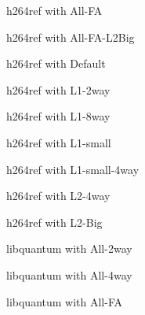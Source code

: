 \documentclass[cacheSimReport.tex]{subfiles}
\begin{document}

\pagebreak
\begin{center}
{\Large{h264ref with All-FA}}
\end{center}

\pagebreak
\begin{center}
{\Large{h264ref with All-FA-L2Big}}
\end{center}

\pagebreak
\begin{center}
{\Large{h264ref with Default}}
\end{center}

\pagebreak
\begin{center}
{\Large{h264ref with L1-2way}}
\end{center}

\pagebreak
\begin{center}
{\Large{h264ref with L1-8way}}
\end{center}

\pagebreak
\begin{center}
{\Large{h264ref with L1-small}}
\end{center}

\pagebreak
\begin{center}
{\Large{h264ref with L1-small-4way}}
\end{center}

\pagebreak
\begin{center}
{\Large{h264ref with L2-4way}}
\end{center}

\pagebreak
\begin{center}
{\Large{h264ref with L2-Big}}
\end{center}

\pagebreak
\begin{center}
{\Large{libquantum with All-2way}}
\end{center}

\pagebreak
\begin{center}
{\Large{libquantum with All-4way}}
\end{center}

\pagebreak
\begin{center}
{\Large{libquantum with All-FA}}
\end{center}

\end{document}
